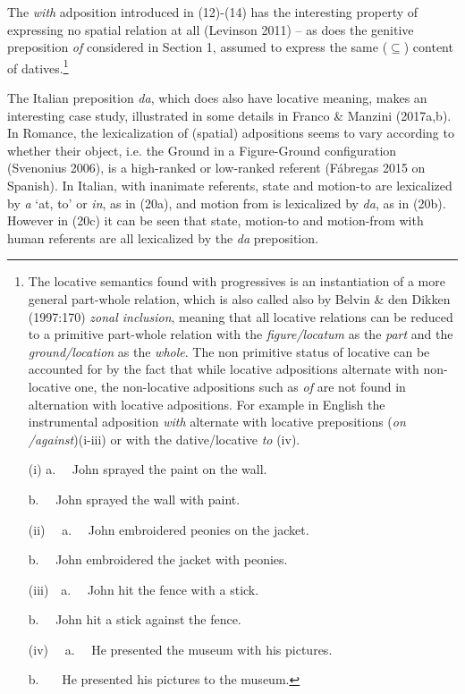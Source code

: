 \documentclass[12pt]{article}
\newenvironment{styleStandard}{\setlength\leftskip{0cm}\setlength\rightskip{0cm plus 1fil}\setlength\parindent{0cm}\setlength\parfillskip{0pt plus 1fil}\setlength\parskip{0in plus 1pt}\writerlistparindent\writerlistleftskip\leavevmode\normalfont\normalsize\writerlistlabel\ignorespaces}{\unskip\vspace{0.111in plus 0.0111in}\par}
\newcommand\writerlistleftskip{}
\newcommand\writerlistparindent{}
\newcommand\writerlistlabel{}
\begin{document}
\begin{styleStandard}
The \textit{with} adposition introduced in (12)-(14) has the interesting property of expressing no spatial relation at all (Levinson 2011) – as does the genitive preposition \textit{of }considered in Section 1, assumed to express the same (${\subseteq}$) content of datives.\footnote{ The locative semantics found with progressives is an instantiation of a more general part-whole relation, which is also called also by Belvin \& den Dikken (1997:170) \textit{zonal inclusion}, meaning that all locative relations can be reduced to a primitive part-whole relation with the \textit{figure/locatum} as the \textit{part} and the \textit{ground/location} as the \textit{whole}. The non primitive status of locative can be accounted for by the fact that while locative adpositions alternate with non-locative one, the non-locative adpositions such as \textit{of} are not found in alternation with locative adpositions. For example in English the instrumental adposition \textit{with} alternate with locative prepositions (\textit{on /against})(i-iii) or with the dative/locative \textit{to }(iv). \par (i) a. \ \ John sprayed the paint on the wall. \par b. \ \ John sprayed the wall with paint.\par (ii) \ \ a. \ \ John embroidered peonies on the jacket. \par b. \ \ John embroidered the jacket with peonies.\par (iii)\ \ a. \ \ John hit the fence with a stick. \par b. \ \ John hit a stick against the fence.\par (iv) \ \ a. \ \ He presented the museum with his pictures.\par b. \ \ \ He presented his pictures to the museum.} 
\end{styleStandard}

\begin{styleStandard}
The Italian preposition \textit{da}, which does also have locative meaning, makes an interesting case study, illustrated in some details in Franco \& Manzini (2017a,b). In Romance, the lexicalization of (spatial) adpositions seems to vary according to whether their object, i.e. the Ground in a Figure-Ground configuration (Svenonius 2006), is a high-ranked or low-ranked referent (Fábregas 2015 on Spanish). In Italian, with inanimate referents, state and motion-to are lexicalized by \textit{a }‘at, to’ or \textit{in}, as in (20a), and motion from is lexicalized by \textit{da}, as in (20b). However in (20c) it can be seen that state, motion-to and motion-from with human referents are all lexicalized by the \textit{da }preposition. 
\end{styleStandard}
\end{document}
